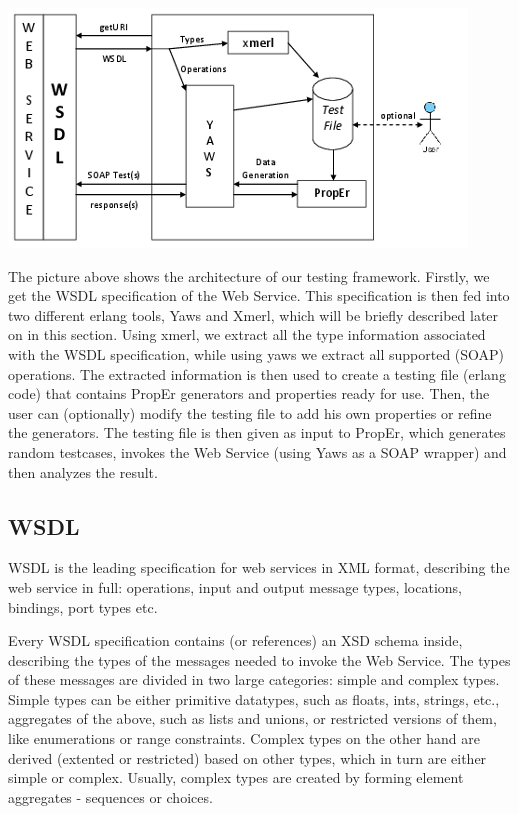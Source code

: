 \documentclass[submission,copyright,a4]{eptcs}
\begin{document}
\includegraphics{PropErWebFramework.png}

The picture above shows the architecture of our testing framework. Firstly, we get the WSDL specification of the Web Service. This specification is then fed into two different erlang tools, Yaws and Xmerl, which will be briefly described later on in this section. Using xmerl, we extract all the type information associated with the WSDL specification, while using yaws we extract all supported (SOAP) operations. The extracted information is then used to create a testing file (erlang code) that contains PropEr generators and properties ready for use. Then, the user can (optionally) modify the testing file to add his own properties or refine the generators. The testing file is then given as input to PropEr, which generates random testcases, invokes the Web Service (using Yaws as a SOAP wrapper) and then analyzes the result.


\subsection{WSDL}

WSDL is the leading specification for web services in XML format, describing the web service in full: operations, input and output message types, locations, bindings, port types etc. 

Every WSDL specification contains (or references) an XSD schema inside, describing the types of the messages needed to invoke the Web Service. The types of these messages are divided in two large categories: simple and complex types. Simple types can be either primitive datatypes, such as floats, ints, strings, etc., aggregates of the above, such as lists and unions, or restricted versions of them, like enumerations or range constraints. Complex types on the other hand are derived (extented or restricted) based on other types, which in turn are either simple or complex. Usually, complex types are created by forming element aggregates - sequences or choices. 
\end{document}
